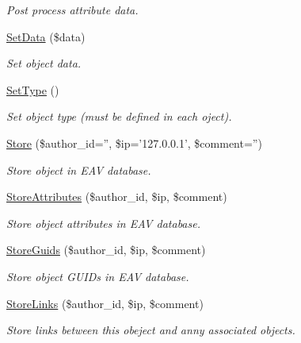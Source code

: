 \begin{CompactItemize}
\begin{CompactList}\small\item\em Post process attribute data. \item\end{CompactList}\item 
\hyperlink{class_object_ad5c98da6f5d954fe8ad17294f9d16ce}{SetData} (\$data)
\begin{CompactList}\small\item\em Set object data. \item\end{CompactList}\item 
\hypertarget{class_object_ded52fbeea8b723ce53f8c2af3793869}{
\hyperlink{class_object_ded52fbeea8b723ce53f8c2af3793869}{SetType} ()}
\label{class_object_ded52fbeea8b723ce53f8c2af3793869}

\begin{CompactList}\small\item\em Set object type (must be defined in each oject). \item\end{CompactList}\item 
\hyperlink{class_object_9a2ddfa89273d2f5e0d192b6c77d3d83}{Store} (\$author\_\-id='', \$ip='127.0.0.1', \$comment='')
\begin{CompactList}\small\item\em Store object in EAV database. \item\end{CompactList}\item 
\hyperlink{class_object_bc9a36b7d0f2b7d5f6ac5467a244b7a0}{StoreAttributes} (\$author\_\-id, \$ip, \$comment)
\begin{CompactList}\small\item\em Store object attributes in EAV database. \item\end{CompactList}\item 
\hyperlink{class_object_dedb212835b4a878c89f7682ae11f772}{StoreGuids} (\$author\_\-id, \$ip, \$comment)
\begin{CompactList}\small\item\em Store object GUIDs in EAV database. \item\end{CompactList}\item 
\hyperlink{class_object_b969bdfbdff62485da5de7e12f1ea68d}{StoreLinks} (\$author\_\-id, \$ip, \$comment)
\begin{CompactList}\small\item\em Store links between this obeject and anny associated objects. \item\end{CompactList}\end{CompactItemize}


